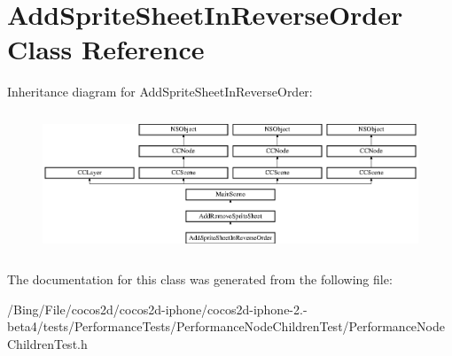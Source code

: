 \hypertarget{interface_add_sprite_sheet_in_reverse_order}{\section{Add\-Sprite\-Sheet\-In\-Reverse\-Order Class Reference}
\label{interface_add_sprite_sheet_in_reverse_order}
}
Inheritance diagram for Add\-Sprite\-Sheet\-In\-Reverse\-Order\-:\begin{figure}[H]
\begin{center}
\leavevmode
\includegraphics[height=4.221106cm]{interface_add_sprite_sheet_in_reverse_order}
\end{center}
\end{figure}


The documentation for this class was generated from the following file\-:\begin{DoxyCompactItemize}
\item 
/\-Bing/\-File/cocos2d/cocos2d-\/iphone/cocos2d-\/iphone-\/2.-\/beta4/tests/\-Performance\-Tests/\-Performance\-Node\-Children\-Test/Performance\-Node\-Children\-Test.\-h\end{DoxyCompactItemize}
